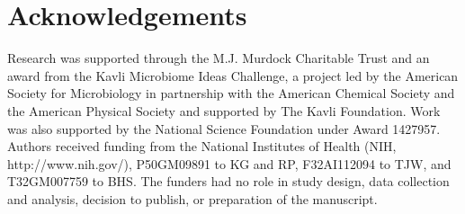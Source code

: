 { \section{Acknowledgements}

Research was supported through the M.J. Murdock Charitable Trust and an award from the Kavli Microbiome Ideas Challenge, a project led by the American Society for Microbiology in partnership with the American Chemical Society and the American Physical Society and supported by The Kavli Foundation. Work was also supported by the National Science Foundation under Award 1427957. Authors received funding from the National Institutes of Health (NIH, http://www.nih.gov/), P50GM09891 to KG and RP, F32AI112094 to TJW, and T32GM007759 to BHS. The funders had no role in study design, data collection and analysis, decision to publish, or preparation of the manuscript.










}
